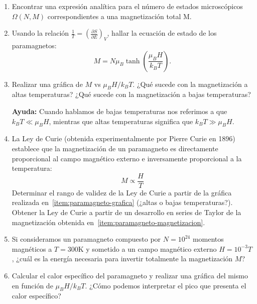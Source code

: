 \documentclass[a4paper,11pt]{article}
\begin{document}
\begin{enumerate}[label=(\alph*),
                  leftmargin=2\parindent,
                  rightmargin=2\parindent]

    \item{Encontrar una expresión analítica para el número de
          estados microscópicos $\Omega(N, M)$ correspondientes a una
          magnetización total M.
          }

    \item{\label{item:paramagneto-magnetizacion}
          Usando la relación
          $\frac{1}{T} = \left( \frac{\partial S}{\partial E} \right)_V$,
          hallar la ecuación de estado de los paramagnetos:
          $$ M = N \mu_B \tanh \left( \frac{\mu_B H}{k_B T} \right).$$
          }

    \item{\label{item:paramagneto-grafica}
          Realizar una gráfica de $M$ vs $\mu_B H/k_B T$.
          ¿Qué sucede con la magnetización a altas temperaturas?
          ¿Qué sucede con la magnetización a bajas temperaturas?
          }

    {\small
    \textbf{Ayuda:} Cuando hablamos de bajas temperaturas nos referimos
    a que $k_B T \ll \mu_B H$, mientras que altas temperaturas
    significa que $k_B T \gg \mu_B H$.
    }

    \item{La Ley de Curie (obtenida experimentalmente por Pierre Curie en 1896)
          establece que la magnetización de un paramagneto es
          directamente proporcional al campo magnético externo e
          inversamente proporcional a la temperatura:
          $$ M \propto \frac{H}{T} $$
          Determinar el rango de validez de la Ley de Curie a partir de la
          gráfica realizada en~\ref{item:paramagneto-grafica}
          (¿altas o bajas temperaturas?).\\
          Obtener la Ley de Curie a partir de un desarrollo en series
          de Taylor de la magnetización obtenida
          en~\ref{item:paramagneto-magnetizacion}.
          }

    \item{Si consideramos un paramagneto compuesto por $N = 10^{24}$
          momentos magnéticos a $T = 300 \text{K}$ y sometido a un
          campo magnético externo $H = 10^{-3} T$,
          ¿cuál es la energía necesaria para invertir totalmente la
          magnetización $M$?
          }

    \item{Calcular el calor específico del paramagneto y realizar una
          gráfica del mismo en función de $\mu_B H / k_B T$.
          ¿Cómo podemos interpretar el pico que presenta el calor específico?
          }

\end{enumerate}
\end{document}
